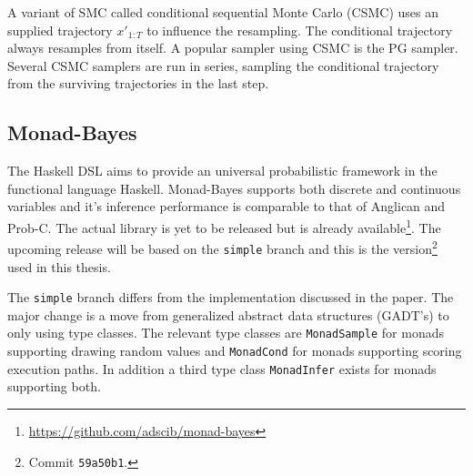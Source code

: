 A variant of SMC called conditional sequential Monte Carlo (CSMC) uses an supplied trajectory $x'_{1:T}$ to influence the resampling. The conditional trajectory always resamples from itself. A popular sampler using CSMC is the PG sampler.
Several CSMC samplers are run in series, sampling the conditional trajectory from the surviving trajectories in the last step.

\subsection{Monad-Bayes}
\label{sec:mbayes}

The Haskell DSL aims to provide an universal probabilistic
framework in the functional language Haskell. Monad-Bayes supports both
discrete and continuous variables and it's inference performance is comparable to that of
Anglican and Prob-C. The actual library is yet to be released but is already
available\footnote{\url{https://github.com/adscib/monad-bayes}}. The upcoming release
will be based on the \texttt{simple} branch and this is the
version\footnote{Commit \texttt{59a50b1}.} used in this thesis.

The \texttt{simple} branch differs from the implementation discussed in the
paper. The major change is a move from generalized abstract data structures
(GADT's) to only using type classes. The relevant type classes are
\texttt{MonadSample} for monads supporting drawing random values and
\texttt{MonadCond} for monads supporting scoring execution paths. In addition a third type class
\texttt{MonadInfer} exists for monads supporting both.

